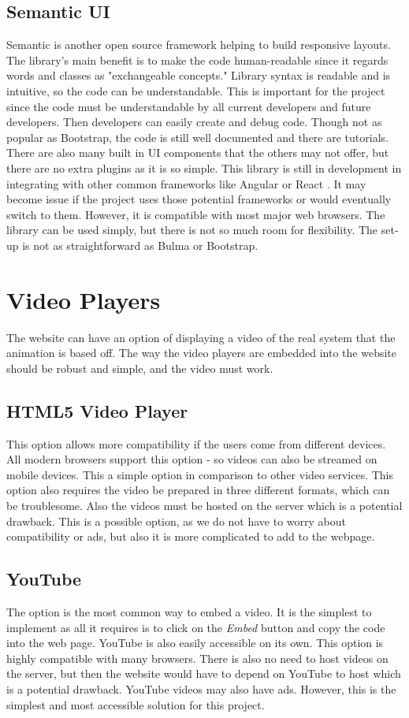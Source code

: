 \documentclass[capstone.tex]{subfiles}
\begin{document}
\subsection{Semantic UI}
Semantic is another open source framework helping to build responsive layouts. 
The library's main benefit is to make the code human-readable since it regards words and classes as "exchangeable concepts."
Library syntax is readable and is intuitive, so the code can be understandable. This is important for the project since the code must be understandable by all current developers and future developers. 
Then developers can easily create and debug code.
Though not as popular as Bootstrap, the code is still well documented and there are tutorials. 
There are also many built in UI components that the others may not offer, but there are no extra plugins as it is so simple. 
This library is still in development in integrating with other common frameworks like Angular or React \cite{semantic}. It may become issue if the project uses those potential frameworks or would eventually switch to them. However, it is compatible with most major web browsers.
The library can be used simply, but there is not so much room for flexibility. The set-up is not as straightforward as Bulma or Bootstrap.

\section{Video Players}
The website can have an option of displaying a video of the real system that the animation is based off. The way the video players are embedded into the website should be robust and simple, and the video must work. 

\subsection{HTML5 Video Player}
This option allows more compatibility if the users come from different devices. All modern browsers support this option - so videos can also be streamed on mobile devices. This a simple option in comparison to other video services.
This option also requires the video be prepared in three different formats, which can be troublesome. Also the videos must be hosted on the server which is a potential drawback. This is a possible option, as we do not have to worry about compatibility or ads, but also it is more complicated to add to the webpage. 

\subsection{YouTube}
The option is the most common way to embed a video. It is the simplest to implement as all it requires is to click on the \textit{Embed} button and copy the code into the web page. YouTube is also easily accessible on its own. This option is highly compatible with many browsers. There is also no need to host videos on the server, but then the website would have to depend on YouTube to host which is a potential drawback. YouTube videos may also have ads. However, this is the simplest and most accessible solution for this project.
\end{document}
